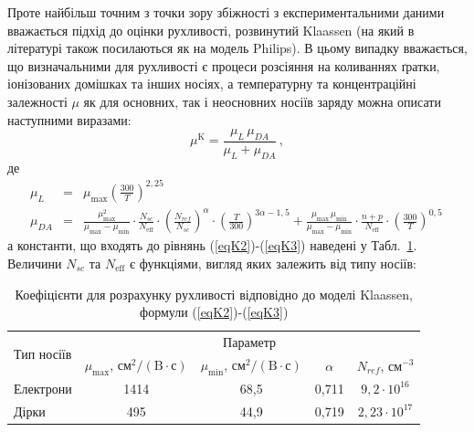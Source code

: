 \documentclass[12pt,a4paper,titlepage,oneside]{book}
\numberwithin{equation}{part}
\begin{document}
Проте найбільш точним з точки зору збіжності з експериментальними даними вважається підхід до оцінки рухливості, розвинутий   Klaassen \cite{KLAASSEN953}
(на який в  літературі також посилаються як на модель Philips).
В цьому випадку вважається, що визначальними для рухливості є процеси розсіяння на коливаннях ґратки, іонізованих домішках та інших носіях, а температурну та
концентраційні залежності $\mu$ як для основних, так і неосновних носіїв заряду можна описати наступними виразами:
\begin{equation}\label{eqK1}
  \mu^\mathrm{K}=\frac{\mu_L\,\mu_{DA}}{\mu_L+\mu_{DA}}\,,
\end{equation}
де
\begin{eqnarray}
  \label{eqK2}
  \mu_L &=&  \mu_\mathrm{max} \left(\frac{300}{T}\right)^{2,25}\, \\ \label{eqK3}
  \mu_{DA}  &=& \frac{\mu_\mathrm{max}^2}{\mu_\mathrm{max} - \mu_\mathrm{min}} \cdot
    \frac{N_{sc}}{N_\mathrm{eff}} \cdot \left(\frac{N_{ref}}{N_{sc}}\right)^{\alpha} \cdot \left(\frac{T}{300}\right)^{3\alpha - 1,5}
    + \frac{\mu_\mathrm{max} \, \mu_\mathrm{min}}{\mu_\mathrm{max} - \mu_\mathrm{min}} \cdot \frac{n + p}{N_\mathrm{eff}} \cdot \left(\frac{300}{T}\right)^{0,5}\,
\end{eqnarray}
а константи, що входять до рівнянь (\ref{eqK2})-(\ref{eqK3}) наведені у Табл.~\ref{tblK1}.
Величини $N_{sc}$ та $N_\mathrm{eff}$ є функціями, вигляд яких залежить від типу носіїв:

\begin{table}
\caption{Коефіцієнти для розрахунку рухливості відповідно до моделі Klaassen, формули (\ref{eqK2})-(\ref{eqK3})}
\label{tblK1}
\centering
\begin{tabular}{|l|c|c|c|c|}
\hline
\multirow{2}{*}{Тип носіїв} & \multicolumn{4}{c|}{Параметр} \\
\cline{2-5}
&$\mu_\mathrm{max}$, $\text{см}^2/(\text{B}\cdot\text{с})$&$\mu_\mathrm{min}$, $\text{см}^2/(\text{B}\cdot\text{с})$&$\alpha$&$N_{ref}$, см$^{-3}$ \rule{0pt}{13pt}\\
\hline
Електрони&1414&68,5&0,711&$9,2\cdot10^{16}$\\
\hline
Дірки&495&44,9&0,719&$2,23\cdot10^{17}$\\
\hline
\end{tabular}
\end{table}
\end{document}
